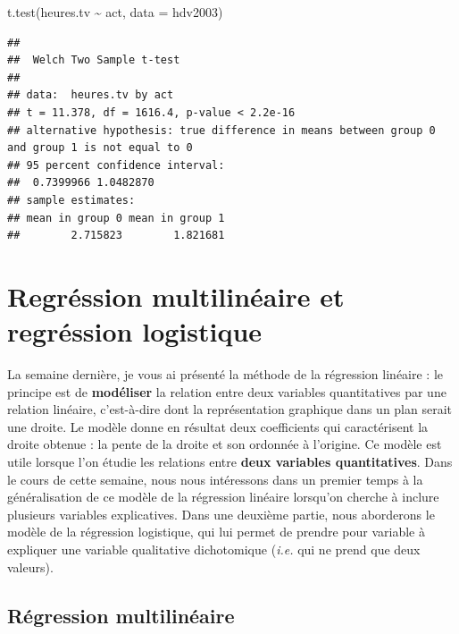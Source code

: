 \documentclass[
  french,
]{book}
\newenvironment{Shaded}{\begin{snugshade}}{\end{snugshade}}
\newcommand{\AttributeTok}[1]{\textcolor[rgb]{0.77,0.63,0.00}{#1}}
\newcommand{\FunctionTok}[1]{\textcolor[rgb]{0.00,0.00,0.00}{#1}}
\newcommand{\NormalTok}[1]{#1}
\newcommand{\SpecialCharTok}[1]{\textcolor[rgb]{0.00,0.00,0.00}{#1}}
\begin{document}
\begin{Shaded}
\begin{Highlighting}[]
\FunctionTok{t.test}\NormalTok{(heures.tv }\SpecialCharTok{\textasciitilde{}}\NormalTok{ act, }\AttributeTok{data =}\NormalTok{ hdv2003)}
\end{Highlighting}
\end{Shaded}

\begin{verbatim}
## 
##  Welch Two Sample t-test
## 
## data:  heures.tv by act
## t = 11.378, df = 1616.4, p-value < 2.2e-16
## alternative hypothesis: true difference in means between group 0 and group 1 is not equal to 0
## 95 percent confidence interval:
##  0.7399966 1.0482870
## sample estimates:
## mean in group 0 mean in group 1 
##        2.715823        1.821681
\end{verbatim}

\hypertarget{regruxe9ssion-multilinuxe9aire-et-regruxe9ssion-logistique}{%
\chapter{Regréssion multilinéaire et regréssion logistique}\label{regruxe9ssion-multilinuxe9aire-et-regruxe9ssion-logistique}}

La semaine dernière, je vous ai présenté la méthode de la régression linéaire : le principe est de \textbf{modéliser} la relation entre deux variables quantitatives par une relation linéaire, c'est-à-dire dont la représentation graphique dans un plan serait une droite. Le modèle donne en résultat deux coefficients qui caractérisent la droite obtenue : la pente de la droite et son ordonnée à l'origine. Ce modèle est utile lorsque l'on étudie les relations entre \textbf{deux variables quantitatives}. Dans le cours de cette semaine, nous nous intéressons dans un premier temps à la généralisation de ce modèle de la régression linéaire lorsqu'on cherche à inclure plusieurs variables explicatives. Dans une deuxième partie, nous aborderons le modèle de la régression logistique, qui lui permet de prendre pour variable à expliquer une variable qualitative dichotomique (\emph{i.e.} qui ne prend que deux valeurs).

\hypertarget{ruxe9gression-multilinuxe9aire}{%
\section{Régression multilinéaire}\label{ruxe9gression-multilinuxe9aire}}
\end{document}
